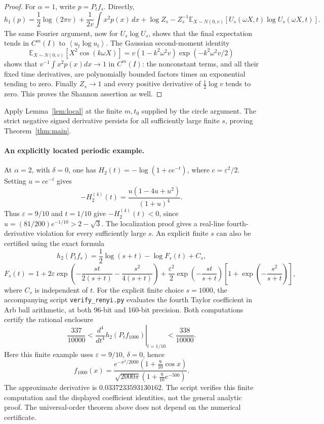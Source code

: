 \documentclass[11pt]{article}
\newcommand{\av}[1]{\left\langle #1\right\rangle}
\begin{document}
\begin{proof}
For $\alpha=1$, write $p=P_t f_s$. Directly,
\[
 h_1(p)=\frac12\log(2\pi v)+\frac{1}{2v}\int x^2p(x)\,dx
 +\log Z_s-Z_s^{-1}\mathbb E_{X\sim N(0,v)}[U_s(\omega X,t)\log U_s(\omega X,t)].
\]
The same Fourier argument, now for $U_s\log U_s$, shows that the final expectation tends in $C^m(I)$ to $\av{u_t\log u_t}$. The Gaussian second-moment identity
\[
 \mathbb E_{X\sim N(0,v)}[X^2\cos(k\omega X)]
 =v(1-k^2\omega^2v)\exp(-k^2\omega^2v/2)
\]
shows that $v^{-1}\int x^2p(x)dx\to1$ in $C^m(I)$: the nonconstant terms, and all their fixed time derivatives, are polynomially bounded factors times an exponential tending to zero. Finally $Z_s\to1$ and every positive derivative of $\frac12\log v$ tends to zero. This proves the Shannon assertion as well.
\end{proof}

Apply Lemma~\ref{lem:local} at the finite $m,t_0$ supplied by the circle argument. The strict negative signed derivative persists for all sufficiently large finite $s$, proving Theorem~\ref{thm:main}.

\paragraph{An explicitly located periodic example.}
At $\alpha=2$, with $\delta=0$, one has $H_2(t)=-\log(1+ce^{-t})$, where $c=\varepsilon^2/2$. Setting $u=ce^{-t}$ gives
\[
 -H_2^{(4)}(t)=\frac{u(1-4u+u^2)}{(1+u)^4}.
\]
Thus $\varepsilon=9/10$ and $t=1/10$ give $-H_2^{(4)}(t)<0$, since $u=(81/200)e^{-1/10}>2-\sqrt3$. The localization proof gives a real-line fourth-derivative violation for every sufficiently large $s$. An explicit finite $s$ can also be certified using the exact formula
\[
 h_2(P_t f_s)=\frac12\log(s+t)-\log F_s(t)+C_s,
\]
\[
 F_s(t)=1+2\varepsilon\exp\left(-\frac{st}{2(s+t)}-\frac{s^2}{4(s+t)}\right)
 +\frac{\varepsilon^2}{2}\exp\left(-\frac{st}{s+t}\right)
 \left[1+\exp\left(-\frac{s^2}{s+t}\right)\right],
\]
where $C_s$ is independent of $t$. For the explicit finite choice $s=1000$, the accompanying script \texttt{verify\_renyi.py} evaluates the fourth Taylor coefficient in Arb ball arithmetic, at both 96-bit and 160-bit precision. Both computations certify the rational enclosure
\[
 \frac{337}{10000}<\left.\frac{d^4}{dt^4}h_2(P_t f_{1000})\right|_{t=1/10}<\frac{338}{10000}.
\]
Here this finite example uses $\varepsilon=9/10$, $\delta=0$, hence
\[
 f_{1000}(x)=\frac{e^{-x^2/2000}(1+\tfrac9{10}\cos x)}{\sqrt{2000\pi}(1+\tfrac9{10}e^{-500})}.
\]
The approximate derivative is $0.0337233593130162$. The script verifies this finite computation and the displayed coefficient identities, not the general analytic proof. The universal-order theorem above does not depend on the numerical certificate.
\end{document}
